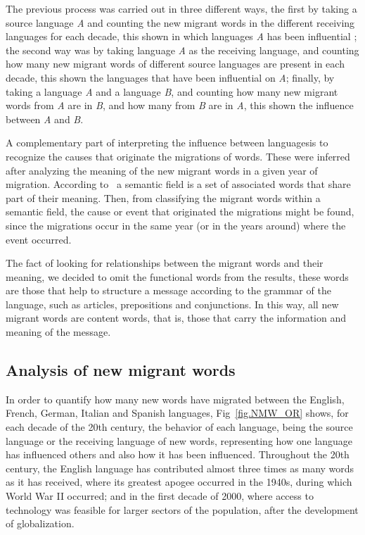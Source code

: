 \documentclass[10pt,letterpaper]{article} %
\begin{document}
The previous process was carried out in three different ways, the first by
taking a source language \textit{A} and counting the new migrant words in the
different receiving languages ​​for each decade, this shown in which
languages \textit{A}​ has been influential ; the second way was by taking
language \textit{A} as the receiving language, and counting how many new
migrant words of different source languages are present in each decade, this
shown the languages that have been influential on \textit{A}; finally, by
taking a language \textit{A} and a language \textit{B}, and counting how many
new migrant words from \textit{A} are in \textit{B}, and how many from
\textit{B} are in \textit{A}, this shown the influence between \textit{A} and
\textit{B}.

A complementary part of interpreting the influence between languages
​​is to recognize the causes that originate the migrations of words.
These were inferred after analyzing the meaning of the new migrant words in a
given year of migration. According to~\cite{semantic_oxford} a semantic field is a set
of associated words that share part of their meaning. Then, from classifying
the migrant words within a semantic field, the cause or event that originated
the migrations might be found, since the migrations occur in the same year (or
in the years around) where the event occurred.

The fact of looking for relationships between the migrant words and their
meaning, we decided to omit the functional words from the results, these words
are those that help to structure a message according to the grammar of the
language, such as articles, prepositions and conjunctions. In this way, all new
migrant words are content words, that is, those that carry the information and
meaning of the message.
\subsection*{Analysis of new migrant words} %

In order to quantify how many new words have migrated between the English,
French, German, Italian and Spanish languages, Fig~\ref{fig.NMW_OR} shows, for
each decade of the 20th century, the behavior of each language, being the
source language or the receiving language of new words, representing how one
language has influenced others and also how it has been influenced. Throughout
the 20th century, the English language has contributed almost three times as
many words as it has received, where its greatest apogee occurred in the
1940s, during which World War II occurred; and in the first decade of 2000,
where access to technology was feasible for larger sectors of the population,
after the development of globalization.
\end{document}
